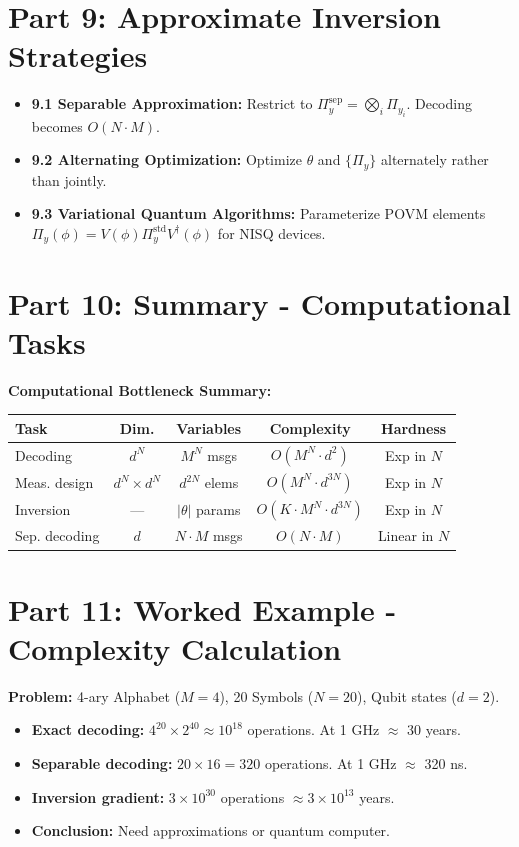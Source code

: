 \documentclass[11pt,a4paper]{article}
\begin{document}
\section{Part 9: Approximate Inversion Strategies}

\begin{itemize}
    \item \textbf{9.1 Separable Approximation:} Restrict to $\Pi_y^{\text{sep}} = \bigotimes_i \Pi_{y_i}$. Decoding becomes $O(N \cdot M)$.
    \item \textbf{9.2 Alternating Optimization:} Optimize $\theta$ and $\{\Pi_y\}$ alternately rather than jointly.
    \item \textbf{9.3 Variational Quantum Algorithms:} Parameterize POVM elements $\Pi_y(\phi) = V(\phi)\Pi_y^{\text{std}}V^\dagger(\phi)$ for NISQ devices.
\end{itemize}

\section{Part 10: Summary - Computational Tasks}

\textbf{Computational Bottleneck Summary:}

\begin{center}
\begin{tabular}{|l|c|c|c|c|}
\hline
\textbf{Task} & \textbf{Dim.} & \textbf{Variables} & \textbf{Complexity} & \textbf{Hardness} \\
\hline
Decoding & $d^N$ & $M^N$ msgs & $O(M^N \cdot d^2)$ & Exp in $N$ \\
\hline
Meas. design & $d^N \times d^N$ & $d^{2N}$ elems & $O(M^N \cdot d^{3N})$ & Exp in $N$ \\
\hline
Inversion & --- & $|\theta|$ params & $O(K \cdot M^N \cdot d^{3N})$ & Exp in $N$ \\
\hline
Sep. decoding & $d$ & $N \cdot M$ msgs & $O(N \cdot M)$ & Linear in $N$ \\
\hline
\end{tabular}
\end{center}

\section{Part 11: Worked Example - Complexity Calculation}

\textbf{Problem:} 4-ary Alphabet ($M = 4$), 20 Symbols ($N = 20$), Qubit states ($d = 2$).

\begin{itemize}
    \item \textbf{Exact decoding:} $4^{20} \times 2^{40} \approx 10^{18}$ operations. At 1 GHz $\approx$ 30 years.
    \item \textbf{Separable decoding:} $20 \times 16 = 320$ operations. At 1 GHz $\approx$ 320 ns.
    \item \textbf{Inversion gradient:} $3 \times 10^{30}$ operations $\approx 3 \times 10^{13}$ years.
    \item \textbf{Conclusion:} Need approximations or quantum computer.
\end{itemize}
\end{document}
